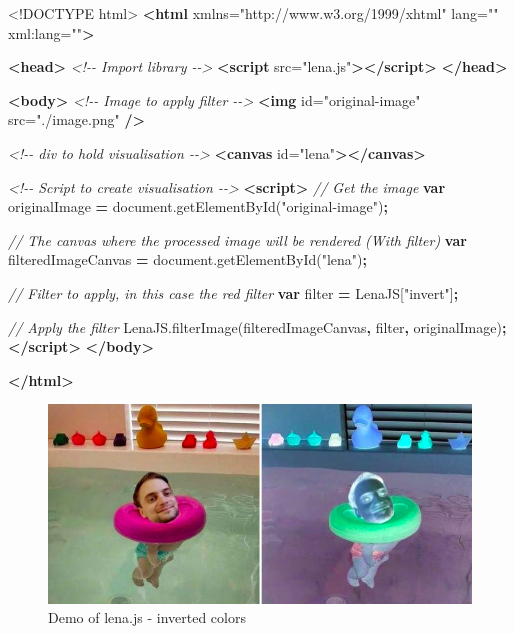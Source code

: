 \documentclass[
]{krantz}
\makeatletter
\newenvironment{Shaded}{\begin{snugshade}}{\end{snugshade}}
\newcommand{\AttributeTok}[1]{\textcolor[rgb]{0.61,0.61,0.61}{#1}}
\newcommand{\CommentTok}[1]{\textcolor[rgb]{0.37,0.37,0.37}{\textit{#1}}}
\newcommand{\DataTypeTok}[1]{\textcolor[rgb]{0.27,0.27,0.27}{#1}}
\newcommand{\KeywordTok}[1]{\textcolor[rgb]{0.27,0.27,0.27}{\textbf{#1}}}
\newcommand{\NormalTok}[1]{#1}
\newcommand{\OperatorTok}[1]{\textcolor[rgb]{0.43,0.43,0.43}{\textbf{#1}}}
\newcommand{\OtherTok}[1]{\textcolor[rgb]{0.37,0.37,0.37}{#1}}
\newcommand{\StringTok}[1]{\textcolor[rgb]{0.5,0.5,0.5}{#1}}
\newcommand{\VariableTok}[1]{\textcolor[rgb]{0,0,0}{#1}}
\newenvironment{kframe}{%
\medskip{}
\setlength{\fboxsep}{.8em}
 \def\at@end@of@kframe{}%
 \ifinner\ifhmode%
  \def\at@end@of@kframe{\end{minipage}}%
  \begin{minipage}{\columnwidth}%
 \fi\fi%
 \def\FrameCommand##1{\hskip\@totalleftmargin \hskip-\fboxsep
 \colorbox{shadecolor}{##1}\hskip-\fboxsep
     \hskip-\linewidth \hskip-\@totalleftmargin \hskip\columnwidth}%
 \MakeFramed {\advance\hsize-\width
   \@totalleftmargin\z@ \linewidth\hsize
   \@setminipage}}%
 {\par\unskip\endMakeFramed%
 \at@end@of@kframe}
\renewenvironment{Shaded}{\begin{kframe}}{\end{kframe}}
\makeatother
\begin{document}
\begin{Shaded}
\begin{Highlighting}[]
\DataTypeTok{<!DOCTYPE }\NormalTok{html}\DataTypeTok{>}
\KeywordTok{<html}\OtherTok{ xmlns=}\StringTok{"http://www.w3.org/1999/xhtml"}\OtherTok{ lang=}\StringTok{""}\OtherTok{ xml:lang=}\StringTok{""}\KeywordTok{>}

\KeywordTok{<head>}
  \CommentTok{<!{-}{-} Import library {-}{-}>}
  \KeywordTok{<script}\OtherTok{ src=}\StringTok{"lena.js"}\KeywordTok{></script>}
\KeywordTok{</head>}

\KeywordTok{<body>}
  \CommentTok{<!{-}{-} Image to apply filter {-}{-}>}
  \KeywordTok{<img}\OtherTok{ id=}\StringTok{"original{-}image"}\OtherTok{ src=}\StringTok{"./image.png"} \KeywordTok{/>}

  \CommentTok{<!{-}{-} div to hold visualisation {-}{-}>}
  \KeywordTok{<canvas}\OtherTok{ id=}\StringTok{"lena"}\KeywordTok{></canvas>}

  \CommentTok{<!{-}{-} Script to create visualisation {-}{-}>}
  \KeywordTok{<script>}
    \CommentTok{// Get the image}
    \KeywordTok{var}\NormalTok{ originalImage }\OperatorTok{=} \VariableTok{document}\NormalTok{.}\AttributeTok{getElementById}\NormalTok{(}\StringTok{"original{-}image"}\NormalTok{)}\OperatorTok{;}

    \CommentTok{// The canvas where the processed image will be rendered (With filter)}
    \KeywordTok{var}\NormalTok{ filteredImageCanvas }\OperatorTok{=} \VariableTok{document}\NormalTok{.}\AttributeTok{getElementById}\NormalTok{(}\StringTok{"lena"}\NormalTok{)}\OperatorTok{;}

    \CommentTok{// Filter to apply, in this case the red filter}
    \KeywordTok{var}\NormalTok{ filter }\OperatorTok{=}\NormalTok{ LenaJS[}\StringTok{"invert"}\NormalTok{]}\OperatorTok{;}

    \CommentTok{// Apply the filter}
    \VariableTok{LenaJS}\NormalTok{.}\AttributeTok{filterImage}\NormalTok{(filteredImageCanvas}\OperatorTok{,}\NormalTok{ filter}\OperatorTok{,}\NormalTok{ originalImage)}\OperatorTok{;}
  \KeywordTok{</script>}
\KeywordTok{</body>}

\KeywordTok{</html>}
\end{Highlighting}
\end{Shaded}

\begin{figure}
\centering
\includegraphics{images/lena-demo.png}
\caption{Demo of lena.js - inverted colors}
\end{figure}
\end{document}
